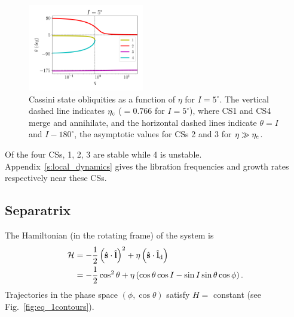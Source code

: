 \documentclass[
        fleqn,
        usenatbib,
    ]{mnras}
\newcommand*{\bm}[1]{\boldsymbol{\mathbf{#1}}}
\newcommand*{\uv}[1]{\hat{\bm{#1}}}
\newcommand*{\p}[1]{\left(#1\right)}
\begin{document}
\begin{figure}
    \includegraphics[width=0.45\textwidth]{plots_diskdisp/2_cs_locs.png}
    \caption{Cassini state obliquities as a function of $\eta$ for $I =
    5^\circ$. The vertical dashed line indicates $\eta_{\rm c}$ ($= 0.766$ for
    $I = 5^\circ$), where CS1 and CS4 merge and annihilate, and the horizontal
    dashed lines indicate $\theta = I$ and $I - 180^\circ$, the asymptotic
    values for CSs 2 and 3 for $\eta \gg \eta_{\rm c}$.}\label{fig:cs_locs}
\end{figure}

Of the four CSs, 1, 2, 3 are stable while 4 is unstable.
Appendix~\ref{s:local_dynamics} gives the libration frequencies and growth rates
respectively near these CSs.

\subsection{Separatrix}

The Hamiltonian (in the rotating frame) of the system is
\begin{align}
    \mathcal{H} &= -\frac{1}{2}\p{\uv{s} \cdot \uv{l}}^2
            + \eta \p{\uv{s} \cdot \uv{l}_{\rm d}}\nonumber\\
        &= -\frac{1}{2}\cos^2\theta
            + \eta \p{\cos \theta \cos I - \sin I \sin \theta \cos \phi}
                \label{eq:H}.
\end{align}
Trajectories in the phase space $\p{\phi, \cos \theta}$ satisfy $H = $ constant
(see Fig.~\ref{fig:eq_1contours}).
\end{document}
